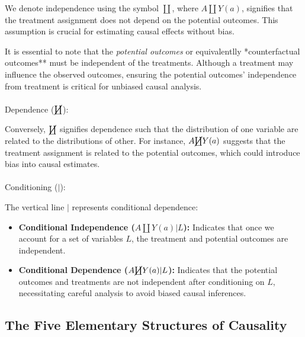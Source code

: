 \documentclass[
  single column]{article}
\makeatletter
\let\oldparagraph\paragraph
\renewcommand{\paragraph}{
    \@ifstar
      \xxxParagraphStar
      \xxxParagraphNoStar
  }
\newcommand{\xxxParagraphStar}[1]{\oldparagraph*{#1}\mbox{}}
\newcommand{\xxxParagraphNoStar}[1]{\oldparagraph{#1}\mbox{}}
\providecommand{\tightlist}{%
  \setlength{\itemsep}{0pt}\setlength{\parskip}{0pt}}\usepackage{longtable,booktabs,array}
\makeatother
\begin{document}
We denote independence using the symbol \(\coprod\), where
\(A \coprod Y(a)\), signifies that the treatment assignment does not
depend on the potential outcomes. This assumption is crucial for
estimating causal effects without bias.

It is essential to note that the \emph{potential outcomes} or
equivalentlly *counterfactual outcomes** must be independent of the
treatments. Although a treatment may influence the observed outcomes,
ensuring the potential outcomes' independence from treatment is critical
for unbiased causal analysis.

\paragraph{\texorpdfstring{Dependence
(\(\cancel\coprod\)):}{Dependence (\textbackslash cancel\textbackslash coprod):}}\label{dependence-cancelcoprod}

Conversely, \(\cancel\coprod\) signifies dependence such that the
distribution of one variable are related to the distributions of other.
For instance, \(A \cancel\coprod Y(a)\) suggests that the treatment
assignment is related to the potential outcomes, which could introduce
bias into causal estimates.

\paragraph{\texorpdfstring{Conditioning
(\(|\)):}{Conditioning (\textbar):}}\label{conditioning}

The vertical line \(|\) represents conditional dependence:

\begin{itemize}
\tightlist
\item
  \textbf{Conditional Independence (\(A \coprod Y(a) | L\)):} Indicates
  that once we account for a set of variables \(L\), the treatment and
  potential outcomes are independent.
\item
  \textbf{Conditional Dependence (\(A \cancel\coprod Y(a) | L\)):}
  Indicates that the potential outcomes and treatments are not
  independent after conditioning on \(L\), necessitating careful
  analysis to avoid biased causal inferences.
\end{itemize}

\subsection{The Five Elementary Structures of
Causality}\label{the-five-elementary-structures-of-causality}
\end{document}
